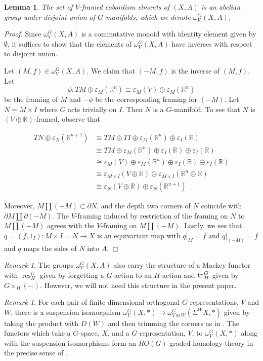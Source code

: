 \documentclass[11pt]{amsart}
\newcommand{\R}{\mathbb R}
\newcommand{\tr}{\textup{tr}\,}
\DeclareMathOperator{\res}{\text{res}}
\theoremstyle{plain}   %
\newtheorem{lem}[thm]{Lemma}
\theoremstyle{definition}
\theoremstyle{remark}
\newtheorem{rmk}[thm]{Remark}
\numberwithin{equation}{section}
\begin{document}
\begin{lem}
The set of $V$-framed cobordism elments of $(X,A)$ is an abelian group under disjoint union of $G$-manifolds, which we denote $\omega_V^G(X,A)$.
\end{lem}
\begin{proof}
Since $\omega_V^G(X,A)$ is a commutative monoid with identity element given by $\emptyset$, it suffices to show that the elements of $\omega_V^G(X,A)$ have inverses with respect to disjoint union. 

Let $(M,f)\in \omega_V^G(X,A)$. We claim that $(-M,f)$ is the inverse of $(M,f)$. Let 
\[
\phi:TM\oplus\varepsilon_M(\R^n)\cong \varepsilon_M(V)\oplus\varepsilon_M(\R^n)
\]
be the framing of $M$ and $-\phi$ be the corresponding framing for $(-M)$. Let $N=M\times I$ where $G$ acts trivially on $I$. Then $N$ is a $G$-manifold. To see that $N$ is $(V\oplus \R)$-framed, observe that

\begin{align*}
TN\oplus\varepsilon_N(\R^{n+1})
& \cong TM\oplus TI \oplus\varepsilon_M(\R^n)\oplus\varepsilon_I(\R)\\
& \cong TM\oplus\varepsilon_M(\R^n)\oplus\varepsilon_I(\R)\oplus\varepsilon_I(\R)\\
& \cong \varepsilon_M(V)\oplus \varepsilon_M(\R^n)\oplus\varepsilon_I(\R)\oplus\varepsilon_I(\R)\\
& \cong \varepsilon_{M\times I}(V\oplus \R) \oplus \varepsilon_{M\times I}(\R^n\oplus \R)\\
& \cong \varepsilon_N(V\oplus \R) \oplus \varepsilon_N(\R^{n+1})
\end{align*}

Moreover, $M\amalg (-M)\subset \partial N$, and the depth two corners of $N$ coincide with $\partial M \amalg \partial (-M)$. The $V$-framing induced by restriction of the framing on $N$ to $M\amalg (-M)$ agrees with the $V$-framing on $M\amalg (-M)$. Lastly, we see that $q=(f,1_I):M\times I=N\to X$ is an equivariant map with $q|_M=f$ and $q|_{(-M)} =f$ and $q$ maps the sides of $N$ into $A$. 
\end{proof}

\begin{rmk}
The groups $\omega_V^G(X,A)$ also carry the structure of a Mackey functor with $\res^G_H$ given by forgetting a $G$-action to an $H$-action and $\tr_H^G$ given by $G\times_H(-)$. However, we will not need this structure in the present paper.
\end{rmk}

\begin{rmk}
For each pair of finite dimensional orthogonal $G$-representations, $V$ and $W$, there is a suspension isomorphism $\omega_V^G(X,*)\to \omega^G_{V\oplus W}(\Sigma^W X,*)$ given by taking the product with $D(W)$ and then trimming the corners as in \cite{gimm}. The functors which take a $G$-space, $X$, and a $G$-representation, $V$, to $\omega_V^G(X,*)$ along with the suspension isomorphisms form an $RO(G)$-graded homology theory in the precise sense of \cite[Chapter XIII]{alaska}.
\end{rmk}
\end{document}
